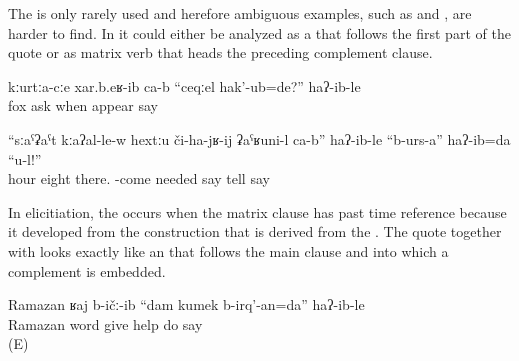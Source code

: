 The    is only rarely used and herefore ambiguous examples, such as  and , are harder to find. In  it could either be analyzed as a   that follows the first part of the quote or as matrix verb that heads the preceding complement clause.
%
\begin{exe}
	\ex	\label{ex:They asked the fox, When were you born?, ...}
	\gll	kːurtːa-cːe	xar.b.eʁ-ib	ca-b	``ceqːel	hak'-ub=de?''	haʔ-ib-le\\
		fox	ask		when	appear	say\\
	\glt	{}

	\ex	\label{ex:‎‎‎It is necessary that he must come, at 8 he must be there, tell him this, I said}
	\gll	``sːaˁʡaˁt	kːaʔal-le-w	hextːu	či-ha-jʁ-ij	ʡaˁʁuni-l	ca-b''	haʔ-ib-le	``b-urs-a''	haʔ-ib=da	``u-l!''\\
		hour	eight	there.	-come	needed		say	tell	say	\\
	\glt	{}
\end{exe}

In elicitiation, the    occurs when the matrix clause has past time reference because it developed from the  construction that is derived from the  . The quote together with  looks exactly like an  that follows the main clause and into which a complement is embedded.
%
\begin{exe}
	\ex	\label{ex:‎‎‎Ramazan gave me his word, I'll help, he said}
	\gll	Ramazan	ʁaj	b-ičː-ib	``dam	kumek	b-irq'-an=da''	haʔ-ib-le\\
		Ramazan	word	give		help	do	say\\
	\glt	{} (E)
\end{exe}

